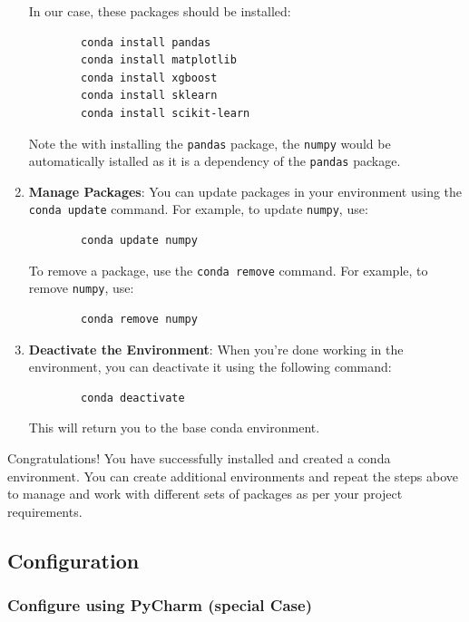 \begin{enumerate}
	In our case, these packages should be installed:
	
	\begin{verbatim}
		conda install pandas
		conda install matplotlib
		conda install xgboost
		conda install sklearn
		conda install scikit-learn
	\end{verbatim}
	
	Note the with installing the \texttt{pandas} package, the \texttt{numpy} would be automatically istalled as it is a dependency of the \texttt{pandas} package.
	
	\item \textbf{Manage Packages}: You can update packages in your environment using the \texttt{conda update} command. For example, to update \texttt{numpy}, use:
	
	\begin{verbatim}
		conda update numpy
	\end{verbatim}
	
	To remove a package, use the \texttt{conda remove} command. For example, to remove \texttt{numpy}, use:
	
	\begin{verbatim}
		conda remove numpy
	\end{verbatim}
	
	\item \textbf{Deactivate the Environment}: When you're done working in the environment, you can deactivate it using the following command:
	
	\begin{verbatim}
		conda deactivate
	\end{verbatim}
	
	This will return you to the base conda environment.
\end{enumerate}

Congratulations! You have successfully installed and created a conda environment. You can create additional environments and repeat the steps above to manage and work with different sets of packages as per your project requirements.

\subsection{Configuration}

\subsubsection{Configure using PyCharm (special Case)}

